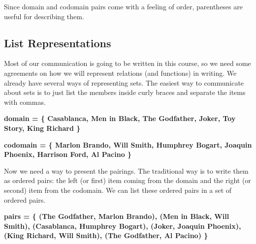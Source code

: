 \documentclass{ximera}
\begin{document}
Since domain and codomain pairs come with a feeling of order, parentheses are useful for describing them.  













\hfill\break













\subsection*{List Representations}

\hfill\break

Most of our communication is going to be written in this course, so we need some agreements on how we will represent relations (and functions) in writing.  We already have several ways of representing sets.  The easiest way to communicate about sets is to just list the members inside curly braces and separate the items with commas.

\begin{center} 
\textbf{\textcolor{blue!75!black}{ domain = \{ Casablanca, Men in Black,  The Godfather, Joker, Toy Story, King Richard \} }}
\end{center}

\begin{center} 
\textbf{\textcolor{blue!75!black}{ codomain = \{ Marlon Brando, Will Smith, Humphrey Bogart, Joaquin Phoenix, Harrison Ford, Al Pacino \} }}
\end{center}

Now we need a way to present the pairings.  The traditional way is to write them as ordered pairs: the left (or first) item coming from the domain and the right (or second) item from the codomain.  We can list these ordered pairs in a set of ordered pairs. 

\begin{center} 
\textbf{\textcolor{blue!75!black}{ pairs = \{ (The Godfather, Marlon Brando), (Men in Black, Will Smith), (Casablanca, Humphrey Bogart), (Joker, Joaquin Phoenix), (King Richard, Will Smith), (The Godfather, Al Pacino) \}  }}
\end{center}
\end{document}
